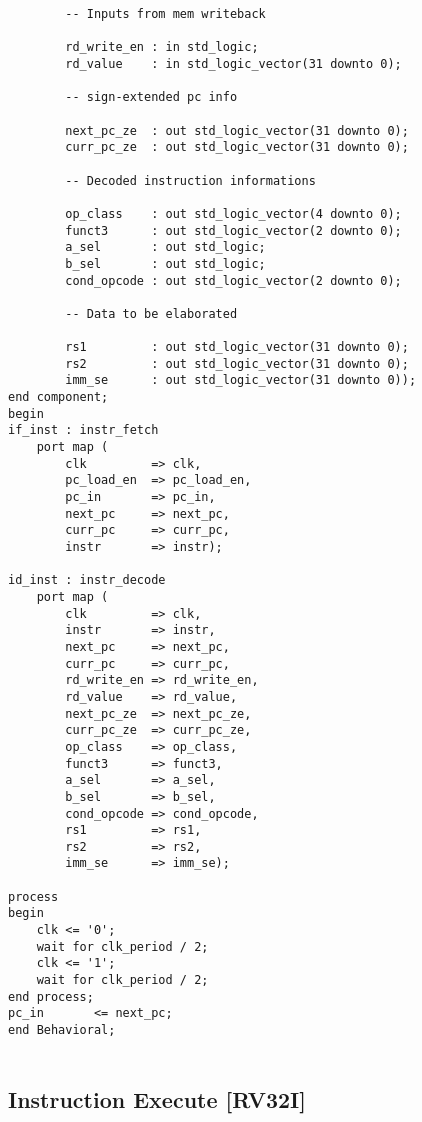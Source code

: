 \begin{code}
\begin{verbatim}
        -- Inputs from mem writeback
        
        rd_write_en : in std_logic;
        rd_value    : in std_logic_vector(31 downto 0);
        
        -- sign-extended pc info
        
        next_pc_ze  : out std_logic_vector(31 downto 0);
        curr_pc_ze  : out std_logic_vector(31 downto 0);
        
        -- Decoded instruction informations
        
        op_class    : out std_logic_vector(4 downto 0);
        funct3      : out std_logic_vector(2 downto 0);
        a_sel       : out std_logic;
        b_sel       : out std_logic;
        cond_opcode : out std_logic_vector(2 downto 0);
        
        -- Data to be elaborated
        
        rs1         : out std_logic_vector(31 downto 0);
        rs2         : out std_logic_vector(31 downto 0);
        imm_se      : out std_logic_vector(31 downto 0));
end component;
begin
if_inst : instr_fetch
    port map (
        clk         => clk,
        pc_load_en  => pc_load_en,
        pc_in       => pc_in,
        next_pc     => next_pc,
        curr_pc     => curr_pc,
        instr       => instr);
    
id_inst : instr_decode
    port map (
        clk         => clk,
        instr       => instr,
        next_pc     => next_pc,
        curr_pc     => curr_pc,
        rd_write_en => rd_write_en,
        rd_value    => rd_value,
        next_pc_ze  => next_pc_ze,
        curr_pc_ze  => curr_pc_ze,
        op_class    => op_class,
        funct3      => funct3,
        a_sel       => a_sel,
        b_sel       => b_sel,
        cond_opcode => cond_opcode,
        rs1         => rs1,
        rs2         => rs2,
        imm_se      => imm_se);

process
begin
    clk <= '0';
    wait for clk_period / 2;
    clk <= '1';
    wait for clk_period / 2;
end process;
pc_in       <= next_pc;
end Behavioral;
    
\end{verbatim}
\end{code}
\newpage


\subsection{Instruction Execute [RV32I]}
